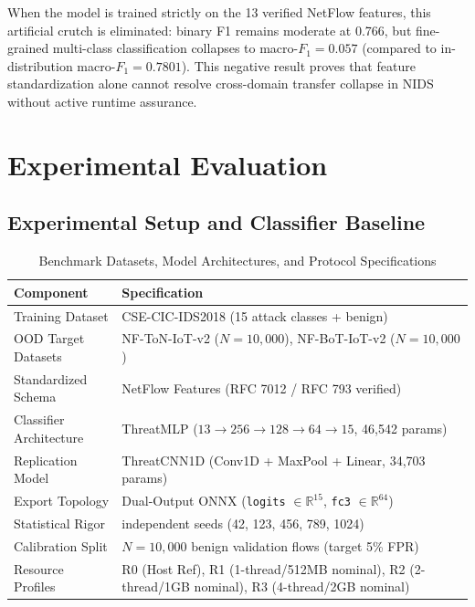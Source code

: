\documentclass[journal]{IEEEtran}
\begin{document}
When the model is trained strictly on the 13 verified NetFlow features, this artificial crutch is eliminated: binary F1 remains moderate at 0.766, but fine-grained multi-class classification collapses to macro-$F_1 = 0.057$ (compared to in-distribution macro-$F_1 = 0.7801$). This negative result proves that feature standardization alone cannot resolve cross-domain transfer collapse in NIDS without active runtime assurance.


\section{Experimental Evaluation}
\label{sec:evaluation}

\subsection{Experimental Setup and Classifier Baseline}

\begin{table}[t]
  \centering
  \footnotesize
  \caption{Benchmark Datasets, Model Architectures, and Protocol Specifications}
  \label{tab:datasets_models}
  \setlength{\tabcolsep}{3pt}
  \begin{tabularx}{\columnwidth}{@{}p{2.6cm}>{\raggedright\arraybackslash}X@{}}
    \toprule
    \textbf{Component} & \textbf{Specification} \\
    \midrule
    Training Dataset & CSE-CIC-IDS2018 (15 attack classes + benign) \\
    OOD Target Datasets & NF-ToN-IoT-v2 ($N=10{,}000$), NF-BoT-IoT-v2 ($N=10{,}000$) \\
    Standardized Schema & 13 NetFlow Features (RFC 7012 / RFC 793 verified) \\
    Classifier Architecture & ThreatMLP ($13 \rightarrow 256 \rightarrow 128 \rightarrow 64 \rightarrow 15$, 46,542 params) \\
    Replication Model & ThreatCNN1D (Conv1D + MaxPool + Linear, 34,703 params) \\
    Export Topology & Dual-Output ONNX (\texttt{logits} $\in \mathbb{R}^{15}$, \texttt{fc3} $\in \mathbb{R}^{64}$) \\
    Statistical Rigor & 5 independent seeds (42, 123, 456, 789, 1024) \\
    Calibration Split & $N=10{,}000$ benign validation flows (target 5\% FPR) \\
    Resource Profiles & R0 (Host Ref), R1 (1-thread/512MB nominal), R2 (2-thread/1GB nominal), R3 (4-thread/2GB nominal) \\
    \bottomrule
  \end{tabularx}
\end{table}
\end{document}
